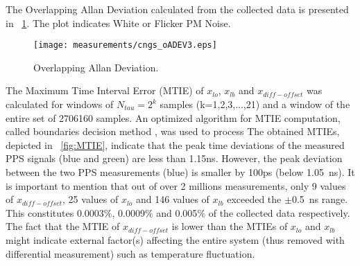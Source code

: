 The Overlapping Allan Deviation calculated from the collected data is presented in 
\figurename~\ref{fig:oADEV}. The plot indicates White or Flicker PM Noise. 

\begin{figure}[!t]
\centering
\texttt{[image: measurements/cngs\_oADEV3.eps]}
\caption{Overlapping Allan Deviation.}
\label{fig:oADEV}
\end{figure}

% 

The Maximum Time Interval Error (MTIE) of $x_{lo}$, $x_{lb}$ and $x_{diff-offset}$ 
was calculated for windows of $N_{tau}=2^k$ samples (k=1,2,3,...,21) and a window of the entire 
set of 2706160 samples. An optimized algorithm for MTIE
computation, called boundaries decision method \cite{biblio:MTIE}, was used to process 
The obtained MTIEs, depicted in \figurename~\ref{fig:MTIE},
indicate that the peak time deviations of the measured PPS signals (blue and green) are less than 1.15ns. 
However, the peak deviation between the two PPS measurements (blue) is smaller by 100ps 
(below 1.05~ns). It is important to mention that out of over 
2 millions measurements, only 9 values of $x_{diff-offset}$, 25 values of $x_{lo}$ and 146 values of 
$x_{lb}$ exceeded the $\pm$0.5~ns range. This constitutes 
0.0003$\%$, 0.0009$\%$ and 0.005$\%$ of the collected data respectively. The fact that the 
MTIE of $x_{diff-offset}$ is lower than the MTIEs of $x_{lo}$ and $x_{lb}$ might indicate 
external factor(s) affecting the entire system (thus removed with differential measurement) such
as temperature fluctuation.


